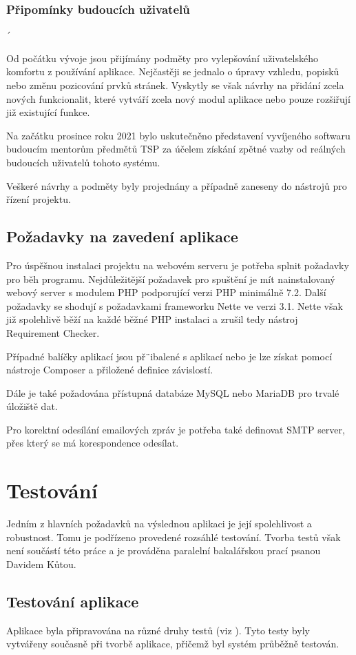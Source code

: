 \documentclass[czech,BP]{thesiskiv}
\begin{document}
	\subsection{Připomínky budoucích uživatelů}´
	\par Od počátku vývoje jsou přijímány podměty pro vylepšování uživatelského komfortu z používání aplikace. Nejčastěji se jednalo o úpravy vzhledu, popisků nebo změnu pozicování prvků stránek. Vyskytly se však návrhy na přidání zcela nových funkcionalit, které vytváří zcela nový modul aplikace nebo pouze rozšiřují již existující funkce.
	\par Na začátku prosince roku 2021 bylo uskutečněno představení vyvíjeného softwaru budoucím mentorům předmětů TSP za účelem získání zpětné vazby od reálných budoucích uživatelů tohoto systému.
	\par Veškeré návrhy a podměty byly projednány a případně zaneseny do nástrojů pro řízení projektu.
	\section{Požadavky na zavedení aplikace}
	\par Pro úspěšnou instalaci projektu na webovém serveru je potřeba splnit požadavky pro běh programu. Nejdůležitější požadavek pro spuštění je mít nainstalovaný webový server s modulem PHP podporující verzi PHP minimálně 7.2. Další požadavky se shodují s požadavkami frameworku Nette ve verzi 3.1. Nette však již spolehlivě běží na každé běžné PHP instalaci a zrušil tedy nástroj Requirement Checker.
	\par Případné balíčky aplikací jsou př¨ibalené s aplikací nebo je lze získat pomocí nástroje Composer a přiložené definice závislostí.
	\par Dále je také požadována přístupná databáze MySQL nebo MariaDB pro trvalé úložiště dat.
	\par Pro korektní odesílání emailových zpráv je potřeba také definovat SMTP server, přes který se má korespondence odesílat.
\chapter{Testování}
	\par Jedním z hlavních požadavků na výslednou aplikaci je její spolehlivost a robustnost. Tomu je podřízeno provedené rozsáhlé testování. Tvorba testů však není součástí této práce a je prováděna paralelní bakalářskou prací  psanou Davidem Kůtou.
	\section{Testování aplikace}
	\par Aplikace byla připravována na různé druhy testů (viz ). Tyto testy byly vytvářeny současně při tvorbě aplikace, přičemž byl systém průběžně testován.
\end{document}
